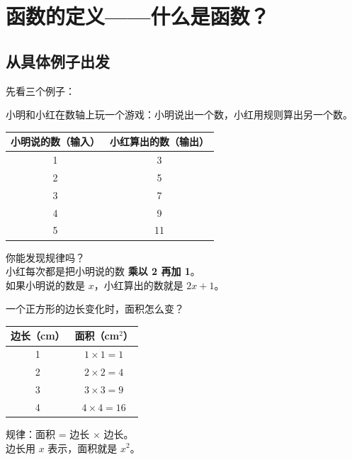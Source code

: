 \section{函数的定义——什么是函数？}

\subsection{从具体例子出发}

先看三个例子：

\begin{examplebox}[1]
小明和小红在数轴上玩一个游戏：小明说出一个数，小红用规则算出另一个数。

\begin{center}
\begin{tabular}{c|c}
\textbf{小明说的数（输入）} & \textbf{小红算出的数（输出）} \\
\hline
1 & 3 \\
2 & 5 \\
3 & 7 \\
4 & 9 \\
5 & 11 \\
\end{tabular}
\end{center}

你能发现规律吗？\\
小红每次都是把小明说的数 \textbf{乘以 2 再加 1}。\\
如果小明说的数是 \(x\)，小红算出的数就是 \(2x + 1\)。
\end{examplebox}

\begin{examplebox}[2]
一个正方形的边长变化时，面积怎么变？

\begin{center}
\begin{tabular}{c|c}
\textbf{边长（cm）} & \textbf{面积（cm\(^2\)）} \\
\hline
1 & \(1\times1 = 1\) \\
2 & \(2\times2 = 4\) \\
3 & \(3\times3 = 9\) \\
4 & \(4\times4 = 16\) \\
\end{tabular}
\end{center}

规律：面积 = 边长 \(\times\) 边长。\\
边长用 \(x\) 表示，面积就是 \(x^2\)。
\end{examplebox}

